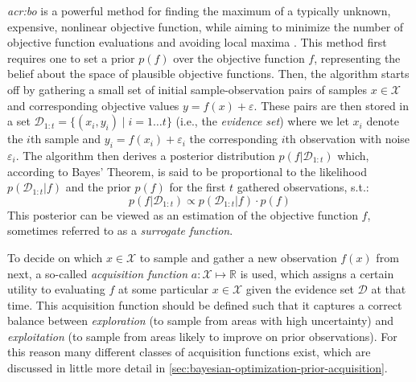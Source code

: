 \textit{\acrfull{acr:bo}} is a powerful method for finding the maximum of a typically unknown, expensive, nonlinear objective function, while aiming to minimize the number of objective function evaluations and avoiding local maxima \cite{Brochu2010}.
This method first requires one to set a prior $p(f)$ over the objective function $f$, representing the belief about the space of plausible objective functions.
Then, the algorithm starts off by gathering a small set of initial sample-observation pairs of samples $x \in \mathcal{X}$ and corresponding objective values $y = f(x) + \varepsilon$.
These pairs are then stored in a set $\mathcal{D}_{1:t} = \{(x_i, y_i) \mid i = 1 \ldots t\}$ (i.e., the \textit{evidence set}) where we let $x_i$ denote the $i$th sample and $y_i = f(x_i) + \varepsilon_i$ the corresponding $i$th observation with noise $\varepsilon_i$.
The algorithm then derives a posterior distribution $p(f \vert \mathcal{D}_{1:t})$ which, according to Bayes' Theorem, is said to be proportional to the likelihood $p(\mathcal{D}_{1:t} \vert f)$ and the prior $p(f)$ for the first $t$ gathered observations, s.t.:
\begin{equation}
	p(f \vert \mathcal{D}_{1:t}) \propto p(\mathcal{D}_{1:t} \vert f) \cdot p(f)
\end{equation}
This posterior can be viewed as an estimation of the objective function $f$, sometimes referred to as a \textit{surrogate function}.

To decide on which $x \in \mathcal{X}$ to sample and gather a new observation $f(x)$ from next, a so-called \textit{acquisition function} $a: \mathcal{X} \mapsto \mathbb{R}$ is used, which assigns a certain utility to evaluating $f$ at some particular $x \in \mathcal{X}$ given the evidence set $\mathcal{D}$ at that time.
This acquisition function should be defined such that it captures a correct balance between \textit{exploration} (to sample from areas with high uncertainty) and \textit{exploitation} (to sample from areas likely to improve on prior observations). For this reason many different classes of acquisition functions exist, which are discussed in little more detail in \autoref{sec:bayesian-optimization-prior-acquisition}.


